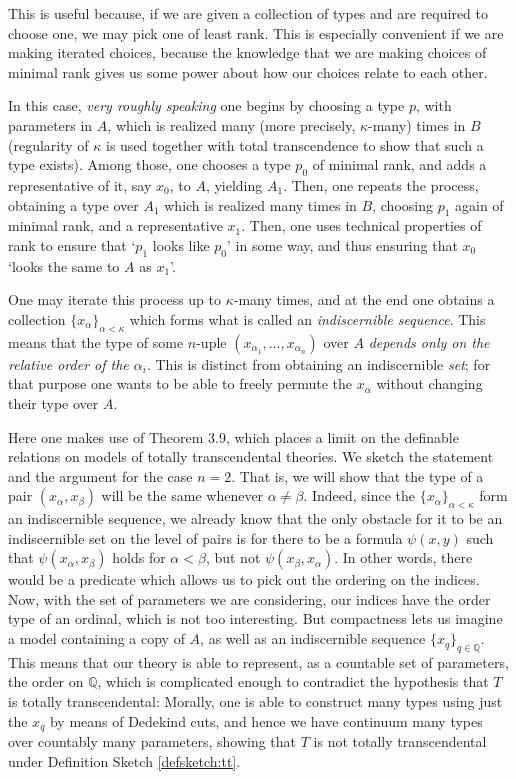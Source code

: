 \documentclass{article}
\theoremstyle{nonumberplain}
\newcommand{\Q}{\mathbb{Q}}
\begin{document}
This is useful because, if we are given a collection of types and are required to choose one, we may pick one of least rank. This is especially convenient if we are making iterated choices, because the knowledge that we are making choices of minimal rank gives us some power about how our choices relate to each other.

In this case, \emph{very roughly speaking} one begins by choosing a type $p$, with parameters in $A$, which is realized many (more precisely, $\kappa$-many) times in $B$ (regularity of $\kappa$ is used together with total transcendence to show that such a type exists). Among those, one chooses a type $p_0$ of minimal rank, and adds a representative of it, say $x_0$, to $A$, yielding $A_1$. Then, one repeats the process, obtaining a type over $A_1$ which is realized many times in $B$, choosing $p_1$ again of minimal rank, and a representative $x_1$. Then, one uses technical properties of rank to ensure that `$p_1$ looks like $p_0$' in some way, and thus ensuring that $x_0$ `looks the same to $A$ as $x_1$'.

One may iterate this process up to $\kappa$-many times, and at the end one obtains a collection $\{x_\alpha\}_{\alpha < \kappa}$ which forms what is called an \emph{indiscernible sequence}. This means that the type of some $n$-uple $(x_{\alpha_1}, \dots, x_{\alpha_n})$ over $A$ \emph{depends only on the relative order of the $\alpha_i$}. This is distinct from obtaining an indiscernible \emph{set}; for that purpose one wants to be able to freely permute the $x_\alpha$ without changing their type over $A$.

Here one makes use of Theorem 3.9, which places a limit on the definable relations on models of totally transcendental theories. We sketch the statement and the argument for the case $n = 2$. That is, we will show that the type of a pair $(x_\alpha, x_\beta)$ will be the same whenever $\alpha \neq \beta$. Indeed, since the $\{x_\alpha\}_{\alpha < \kappa}$ form an indiscernible sequence, we already know that the only obstacle for it to be an indiscernible set on the level of pairs is for there to be a formula $\psi(x,y)$ such that $\psi(x_\alpha,x_\beta)$ holds for $\alpha < \beta$, but not $\psi(x_\beta, x_\alpha)$. In other words, there would be a predicate which allows us to pick out the ordering on the indices. Now, with the set of parameters we are considering, our indices have the order type of an ordinal, which is not too interesting. But compactness lets us imagine a model containing a copy of $A$, as well as an indiscernible sequence $\{x_q\}_{q \in \Q}$. This means that our theory is able to represent, as a countable set of parameters, the order on $\Q$, which is complicated enough to contradict the hypothesis that $T$ is totally transcendental: Morally, one is able to construct many types using just the $x_q$ by means of Dedekind cuts, and hence we have continuum many types over countably many parameters, showing that $T$ is not totally transcendental under Definition Sketch \ref{defsketch:tt}.
\end{document}
